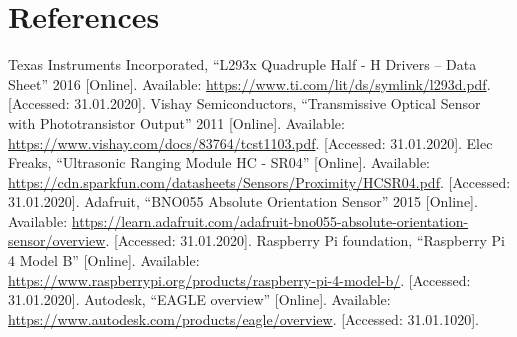 \newpage

\section{References}
\begin{flushleft}
\begin{thebibliography}{99}
 Texas Instruments Incorporated, ``L293x Quadruple Half - H Drivers -- Data Sheet'' 2016 [Online]. Available: \url{https://www.ti.com/lit/ds/symlink/l293d.pdf}. [Accessed: 31.01.2020].
 Vishay Semiconductors, ``Transmissive Optical Sensor with Phototransistor Output'' 2011 [Online]. Available: \url{https://www.vishay.com/docs/83764/tcst1103.pdf}. [Accessed: 31.01.2020].
 Elec Freaks, ``Ultrasonic Ranging Module HC - SR04'' [Online]. Available: \url{https://cdn.sparkfun.com/datasheets/Sensors/Proximity/HCSR04.pdf}. [Accessed: 31.01.2020].
 Adafruit, ``BNO055 Absolute Orientation Sensor'' 2015 [Online]. Available: \url{https://learn.adafruit.com/adafruit-bno055-absolute-orientation-sensor/overview}. [Accessed: 31.01.2020].
 Raspberry Pi foundation, ``Raspberry Pi 4 Model B'' [Online]. Available: \url{https://www.raspberrypi.org/products/raspberry-pi-4-model-b/}. [Accessed: 31.01.2020].
 Autodesk, ``EAGLE overview'' [Online]. Available: \url{https://www.autodesk.com/products/eagle/overview}. [Accessed: 31.01.1020]. 
\end{thebibliography} 

\end{flushleft}

